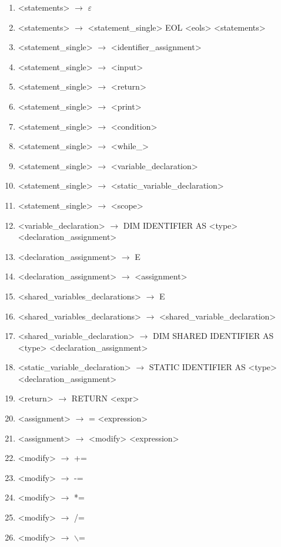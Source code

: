 \begin{normalsize}
\begin{enumerate}
        \item <statements> $\rightarrow$ $\varepsilon$
        \item <statements> $\rightarrow$ <statement\_single> EOL <eols> <statements>


        \item <statement\_single> $\rightarrow$ <identifier\_assignment>
        \item <statement\_single> $\rightarrow$ <input>
        \item <statement\_single> $\rightarrow$ <return>
        \item <statement\_single> $\rightarrow$ <print>
        \item <statement\_single> $\rightarrow$ <condition>
        \item <statement\_single> $\rightarrow$ <while\_>
        \item <statement\_single> $\rightarrow$ <variable\_declaration>
        \item <statement\_single> $\rightarrow$ <static\_variable\_declaration>
        \item <statement\_single> $\rightarrow$ <scope>

        \item <variable\_declaration> $\rightarrow$ DIM IDENTIFIER AS <type> <declaration\_assignment>
        \item <declaration\_assignment> $\rightarrow$ E
        \item <declaration\_assignment> $\rightarrow$ <assignment>

        \item <shared\_variables\_declarations> $\rightarrow$ E
        \item <shared\_variables\_declarations> $\rightarrow$ <shared\_variable\_declaration>
        \item <shared\_variable\_declaration> $\rightarrow$ DIM SHARED IDENTIFIER AS <type> <declaration\_assignment>

        \item <static\_variable\_declaration> $\rightarrow$ STATIC IDENTIFIER AS <type> <declaration\_assignment>

        \item <return> $\rightarrow$ RETURN <expr>

        \item <assignment> $\rightarrow$ = <expression>
        \item <assignment> $\rightarrow$ <modify> <expression>
        \item <modify> $\rightarrow$ +=
        \item <modify> $\rightarrow$ -=
        \item <modify> $\rightarrow$ *=
        \item <modify> $\rightarrow$ /=
        \item <modify> $\rightarrow$ $\backslash$=


\end{enumerate}
\end{normalsize}
